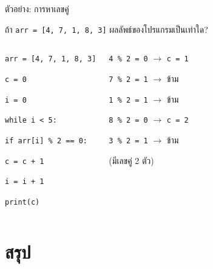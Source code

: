 \documentclass[11pt, aspectratio=169]{beamer}
\newcommand{\py}[1]{\texttt{#1}}
\begin{document}
\begin{frame}{ตัวอย่าง: การหาเลขคู่}
  \begin{exambox}[โจทย์]
    ถ้า \py{arr = [4, 7, 1, 8, 3]} ผลลัพธ์ของโปรแกรมเป็นเท่าใด?
  \end{exambox}
  \begin{columns}[T]
      \begin{exambox}[โปรแกรม]
        \py{arr = [4, 7, 1, 8, 3]}

        \py{c = 0}

        \py{i = 0}

        \py{while i < 5:}

        \qquad \py{if arr[i] \% 2 == 0:}

        \qquad\quad \py{c = c + 1}

        \qquad \py{i = i + 1}

        \py{print(c)}
      \end{exambox}
      \begin{solbox}[วิธีตามรอย]
        \py{4 \% 2 = 0} $\rightarrow$ \py{c = 1}

        \py{7 \% 2 = 1} $\rightarrow$ ข้าม

        \py{1 \% 2 = 1} $\rightarrow$ ข้าม

        \py{8 \% 2 = 0} $\rightarrow$ \py{c = 2}

        \py{3 \% 2 = 1} $\rightarrow$ ข้าม

        \highlight{แสดงผล \py{2}} (มีเลขคู่ 2 ตัว)
      \end{solbox}
  \end{columns}
\end{frame}

\section{สรุป}
\end{document}
